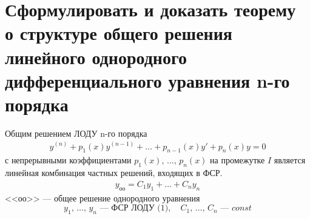 \section{Сформулировать и доказать теорему о структуре общего решения линейного однородного дифференциального уравнения n-го порядка}

\begin{theorem}
    Общим решением ЛОДУ n-го порядка
    \begin{align*}
        y^{(n)} + p_1(x)y^{(n-1)} + \ldots + p_{n-1}(x) y' + p_n(x) y = 0 \tag{1}
    \end{align*}
    с непрерывными коэффициентами $p_1(x),\, \ldots,\, p_n(x)$ на промежутке $I$ является линейная комбинация частных решений, входящих в ФСР.
    \begin{align*}
        y_{\text{оо}} = C_1y_1 + \ldots + C_ny_n \tag{2}
    \end{align*}
    <<оо>> --- общее решение однородного уравнения
    \[
        y_1,\, \ldots,\, y_n \text{ --- ФСР ЛОДУ (1)},\quad C_1,\, \ldots,\, C_n \text{ --- } const
    \]
\end{theorem}
